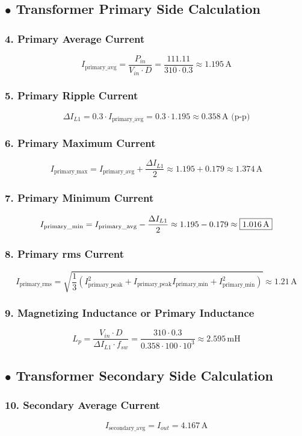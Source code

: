\subsection*{$\bullet$ Transformer Primary Side Calculation}
\subsubsection*{4. Primary Average Current}
\[
I_{\text{primary\_avg}} = \frac{P_{in}}{V_{in} \cdot D} 
= \frac{111.11}{310 \cdot 0.3} \approx \boxed{1.195\,\text{A}}
\]
\subsubsection*{5. Primary Ripple Current}
\[
\Delta I_{L1} = 0.3 \cdot I_{\text{primary\_avg}} = 0.3 \cdot 1.195 \approx \boxed{0.358\,\text{A (p-p)}}
\]
\subsubsection*{6. Primary Maximum Current}
\[
I_{\text{primary\_max}} = I_{\text{primary\_avg}} + \frac{\Delta I_{L1}}{2} 
\approx 1.195 + 0.179 \approx \boxed{1.374\,\text{A}} 
\]
\subsubsection*{7. Primary Minimum Current}
\[
I_{\text{primary\_min}} = I_{\text{primary\_avg}} - \frac{\Delta I_{L1}}{2} 
\approx 1.195 - 0.179 \approx \boxed{1.016\,\text{A}} \\
\]
\subsubsection*{8. Primary rms Current}
\[
I_{\text{primary\_rms}} = \sqrt{\frac{1}{3} \left( I_{\text{primary\_peak}}^2 + I_{\text{primary\_peak}}I_{\text{primary\_min}} + I_{\text{primary\_min}}^2 \right)} 
\approx \boxed{1.21\,\text{A}}
\]
\subsubsection*{9. Magnetizing Inductance or Primary Inductance}
\[
L_p = \frac{V_{in} \cdot D}{\Delta I_{L1} \cdot f_{sw}} 
= \frac{310 \cdot 0.3}{0.358 \cdot 100 \cdot 10^3} \approx \boxed{2.595\,\text{mH}}
\]
\subsection*{$\bullet$ Transformer Secondary Side Calculation}
\subsubsection*{10. Secondary Average Current}
\[
I_{\text{secondary\_avg}} = I_{out} = \boxed{4.167\,\text{A}}
\]
